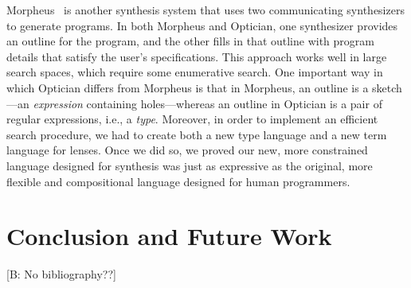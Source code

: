 \documentclass{svproc}
\newcommand{\FINISH}[3]{\ifdraft\textcolor{#1}{[#2: #3]}\fi}
\newcommand{\bcp}[1]{\FINISH{dkred}{B}{#1}}
\begin{document}
Morpheus~\cite{morpheus} is another synthesis system that uses two
communicating synthesizers to generate programs.  In both Morpheus and
Optician, one synthesizer provides an 
outline for the program, and the other fills in that outline with program
details that satisfy the user's specifications.
This approach works well in large search spaces, which
require some enumerative search.
One important way in which Optician differs from Morpheus is that in
Morpheus, an outline is a sketch---an
\emph{expression}
containing holes---whereas
an outline in Optician is a pair of regular
expressions, i.e., a 
\emph{type}.  Moreover, in order to implement an efficient
search procedure, we had to create both a new type language and a new
term language for lenses.  Once we did so, we proved our new, more
constrained language
designed for synthesis was just as expressive as the original, more
flexible and compositional language designed for human programmers.




\section{Conclusion and Future Work}
\label{concl}

\bcp{No bibliography??}
\end{document}
